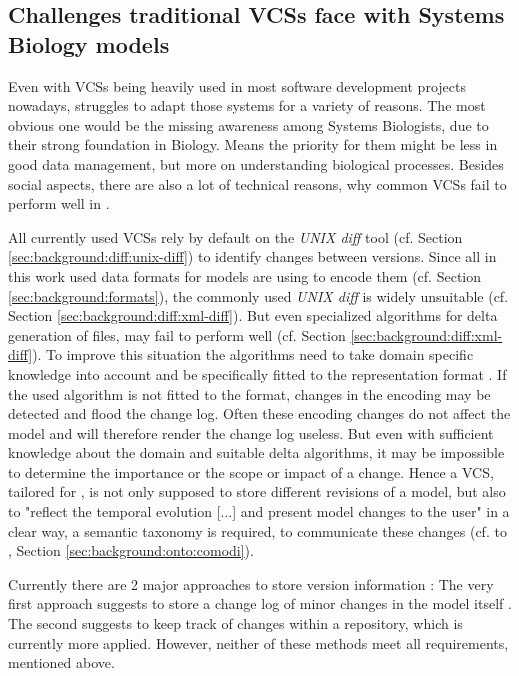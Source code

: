 	\subsection{Challenges traditional VCSs face with Systems Biology models}
	\label{sec:background:manage-versions:challenges}
	
	Even with VCSs being heavily used in most software development projects nowadays, \sysbio struggles to adapt those systems for a variety of reasons.
	The most obvious one would be the missing awareness among Systems Biologists, due to their strong foundation in Biology. Means the priority for them might be less in good data management, but more on understanding biological processes.
	Besides social aspects, there are also a lot of technical reasons, why common VCSs fail to perform well in \sysbio.
	
	All currently used VCSs rely by default on the \emph{UNIX diff} tool (cf. Section \ref{sec:background:diff:unix-diff}) to identify changes between versions. Since all in this work used data formats for \sysbio models are using \xml to encode them (cf. Section \ref{sec:background:formats}), the commonly used \emph{UNIX diff} is widely unsuitable (cf. Section \ref{sec:background:diff:xml-diff}).
	But even specialized algorithms for delta generation of \xml files, may fail to perform well (cf. Section \ref{sec:background:diff:xml-diff}). To improve this situation the algorithms need to take domain specific knowledge into account and be specifically fitted to the representation format \citep{Waltemath2013}.
	If the used algorithm is not fitted to the format, changes in the encoding may be detected and flood the change log. Often these encoding changes do not affect the model and will therefore render the change log useless.
	But even with sufficient knowledge about the domain and suitable \xml delta algorithms, it may be impossible to determine the importance or the scope or impact of a change. Hence a VCS, tailored for \sysbio, is not only supposed to store different revisions of a model, but also to "reflect the temporal evolution [...] and present model changes to the user" \citep{Waltemath2013} in a clear way, a semantic taxonomy is required, to communicate these changes (cf. to \comodi, Section \ref{sec:background:onto:comodi}).
	
	Currently there are 2 major approaches to store version information \citep{Waltemath2013}:
	The very first approach suggests to store a change log of minor changes in the model itself \citep{Beard2009}.
	The second suggests to keep track of changes within a repository, which is currently more applied. However, neither of these methods meet all requirements, mentioned above.
	
